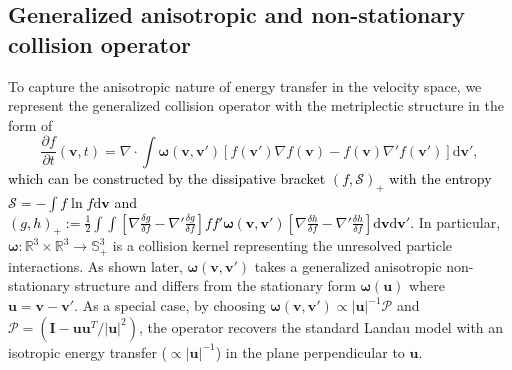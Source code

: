 \documentclass[preprint,1p,times]{elsarticle}
\theoremstyle{definition}
\theoremstyle{remark}
\newcommand{\tcb}[1]{\textcolor{black}{#1}}
\begin{document}
\subsection{Generalized anisotropic and non-stationary collision operator}
\label{sec:generalized_kernel}
To capture the anisotropic nature of energy transfer in the velocity space, we represent the generalized collision operator with the metriplectic structure \cite{morrison1986paradigm} in the form of 
\begin{equation}\label{eq:collision_symplectic}
    \dfrac{\partial f}{\partial t}(\boldsymbol{v},t) = \nabla \cdot \int \boldsymbol{\omega}(\boldsymbol{v}, \boldsymbol{v}') \left[ f(\boldsymbol{v}') \nabla f(\boldsymbol{v}) - f(\boldsymbol{v}) \nabla' f(\boldsymbol{v}') \right] \mathrm{d}\boldsymbol{v}',
\end{equation}
\tcb{which can be constructed by the dissipative bracket $(f, \mathcal{S})_{+}$ with the entropy $\mathcal{S} = -\int f\ln f \mathrm{d}\boldsymbol{v}$ and 
$(g, h)_{+} := \frac{1}{2}
\int \int [\nabla \frac{\delta g}{\delta f} - \nabla' \frac{\delta g}{\delta f}] f f' \bm\omega(\bm v, \bm v') [\nabla \frac{\delta h}{\delta f} - \nabla' \frac{\delta h}{\delta f}] \mathrm{d}\boldsymbol{v} \mathrm{d}\boldsymbol{v}'
$.} In particular, $\boldsymbol{\omega}: \mathbb{R}^3\times\mathbb{R}^3 \to \mathbb{S}^{3}_{+}$ is a collision kernel representing the unresolved particle interactions. As shown later, $\boldsymbol{\omega}(\boldsymbol{v}, \boldsymbol{v}')$ takes a generalized anisotropic non-stationary structure and differs from the stationary form $\boldsymbol{\omega}(\boldsymbol{u})$ where $\boldsymbol{u} = \boldsymbol{v} - \boldsymbol{v}'$. As a special case, by choosing $\boldsymbol{\omega}(\boldsymbol{v}, \boldsymbol{v}') \propto \vert\boldsymbol{u}\vert^{-1}\boldsymbol{\mathcal{P}}$ and $\boldsymbol{\mathcal{P}} = (\boldsymbol{I} - \boldsymbol{u}\boldsymbol{u}^T/\vert \boldsymbol{u}\vert ^{2})$, the operator recovers the standard Landau model with an isotropic energy transfer  ($\propto \vert\boldsymbol{u}\vert^{-1}$) in the plane perpendicular to $\boldsymbol{u}$.
\end{document}
